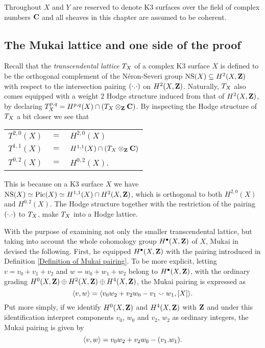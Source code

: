 \vspace{0.3cm}
\noindent
Throughout $X$ and $Y$ are reserved to denote K3 surfaces over the field of complex numbers $\mathbf C$ and all sheaves in this chapter are assumed to be coherent.

\subsection{The Mukai lattice and one side of the proof}

Recall that the \emph{transcendental lattice} $T_{X}$ of a complex K3 surface $X$ is defined to be the orthogonal complement of the Néron-Severi group $\operatorname{NS}(X) \subseteq H^{2}(X, \mathbf Z)$ with respect to the intersection pairing $(\cdot.\cdot)$ on $H^{2}(X, \mathbf Z)$.
Naturally, $T_{X}$ also comes equipped with a weight $2$ Hodge structure induced from that of $H^{2}(X, \mathbf Z)$, by declaring $T_{X}^{p,q} = H^{p,q}(X) \cap (T_{X} \otimes_\mathbf Z \mathbf C)$. By inspecting the Hodge structure of $T_{X}$ a bit closer we see that
\begin{center}
    \begin{tabular}{r c l}
        $T^{2,0}(X)$ & $=$ & $H^{2,0}(X)$ \\
        $T^{1,1}(X)$ & $=$ & $H^{1,1}(X) \cap (T_{X} \otimes_\mathbf Z \mathbf C)$ \\
        $T^{0,2}(X)$ & $=$ & $H^{0,2}(X)$.
    \end{tabular}
\end{center}
This is because on a K3 surface $X$ we have $\operatorname{NS}(X) \simeq \operatorname{Pic}(X) \simeq H^{1,1}(X) \cap H^2(X, \mathbf Z)$, which is orthogonal to both $H^{2,0}(X)$ and $H^{0,2}(X)$.
The Hodge structure together with the restriction of the pairing $(\cdot.\cdot)$ to $T_{X}$, make $T_{X}$ into a Hodge lattice.


With the purpose of examining not only the smaller transcendental lattice, but taking into account the whole cohomology group $H^{\bullet}(X, \mathbf Z)$ of $X$, Mukai in \cite[]{Mukai1987} devised the following. First, he equipped $H^{\bullet}(X, \mathbf Z)$ with the pairing introduced in Definition \ref{Definition of Mukai pairing}. To be more explicit, letting $v = v_0 + v_1 + v_2$ and $w = w_0 + w_1 + w_2$ belong to $H^{\bullet}(X, \mathbf Z)$, with the ordinary grading $H^{0}(X, \mathbf Z) \oplus H^{2}(X, \mathbf Z) \oplus H^{4}(X, \mathbf Z)$, the Mukai pairing is expressed as
\[
    \langle v, w \rangle = \langle v_0w_2 + v_2w_0 - v_1 \smallsmile w_1, [X] \rangle.
\]
Put more simply, if we identify $H^{0}(X, \mathbf Z)$ and $H^{4}(X, \mathbf Z)$ with $\mathbf Z$ and under this identification interpret components $v_0$, $w_0$ and $v_2$, $w_2$ as ordinary integers, the Mukai pairing is given by
\[
    \langle v, w \rangle = v_0w_2 + v_2w_0 - (v_1.w_1).
\] 


